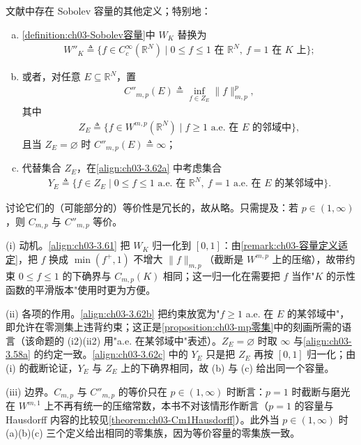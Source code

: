 \documentclass[../../main.tex]{subfiles}%
\begin{document}
\begin{remark}\label{remark:ch03-其他容量定义}
文献中存在 Sobolev 容量的其他定义；特别地：
\begin{enumerate}[(a)]
\item \cref{definition:ch03-Sobolev容量}中 $W_K$ 替换为
\begin{align}
W''_K\triangleq \{f\in C^\infty_c(\mathbb{R}^N)\mid 0\leqslant f\leqslant1\text{ 在 }\mathbb{R}^N,\ f=1\text{ 在 }K\text{ 上}\};\label{align:ch03-3.61}
\end{align}
\item 或者，对任意 $E\subseteq\mathbb{R}^N$，置
\begin{align}
C''_{m,p}(E)\triangleq \inf_{f\in Z_E}\|f\|_{m,p}^p,\label{align:ch03-3.62a}
\end{align}
其中
\begin{align}
Z_E\triangleq \{f\in W^{m,p}(\mathbb{R}^N)\mid f\geqslant1\text{ a.e. 在 }E\text{ 的邻域中}\},\label{align:ch03-3.62b}
\end{align}
且当 $Z_E=\varnothing $ 时 $C''_{m,p}(E)\triangleq \infty$；
\item 代替集合 $Z_E$，在\eqref{align:ch03-3.62a} 中考虑集合
\begin{align}
Y_E\triangleq \{f\in Z_E\mid 0\leqslant f\leqslant1\text{ a.e. 在 }\mathbb{R}^N,\ f=1\text{ a.e. 在 }E\text{ 的某邻域中}\}.\label{align:ch03-3.62c}
\end{align}
\end{enumerate}
讨论它们的（可能部分的）等价性是冗长的，故从略。只需提及：若 $p\in(1,\infty)$，则 $C_{m,p}$ 与 $C''_{m,p}$ 等价。
\end{remark}

\begin{remark}\label{remark:ch03-其他容量定义补充}
(i) 动机。\eqref{align:ch03-3.61} 把 $W_K$ 归一化到 $[0,1]$：由\cref{remark:ch03-容量定义适定}，把 $f$ 换成 $\min(f^+,1)$ 不增大 $\|f\|_{m,p}$（截断是 $W^{m,p}$ 上的压缩），故带约束 $0\leqslant f\leqslant1$ 的下确界与 $C_{m,p}(K)$ 相同；这一归一化在需要把 $f$ 当作"$K$ 的示性函数的平滑版本"使用时更为方便。

(ii) 各项的作用。\eqref{align:ch03-3.62b} 把约束放宽为"$f\geqslant1$ a.e. 在 $E$ 的某邻域中"，即允许在零测集上违背约束；这正是\cref{proposition:ch03-mp零集}中的刻画所需的语言（该命题的 (i2)(ii2) 用"a.e. 在某邻域中"表述）。$Z_E=\varnothing$ 时取 $\infty$ 与\eqref{align:ch03-3.58a} 的约定一致。\eqref{align:ch03-3.62c} 中的 $Y_E$ 只是把 $Z_E$ 再按 $[0,1]$ 归一化；由 (i) 的截断论证，$Y_E$ 与 $Z_E$ 上的下确界相同，故 (b) 与 (c) 给出同一个容量。

(iii) 边界。$C_{m,p}$ 与 $C''_{m,p}$ 的等价只在 $p\in(1,\infty)$ 时断言：$p=1$ 时截断与磨光在 $W^{m,1}$ 上不再有统一的压缩常数，本书不对该情形作断言（$p=1$ 的容量与 Hausdorff 内容的比较见\cref{theorem:ch03-Cm1Hausdorff}）。此外当 $p\in(1,\infty)$ 时 (a)(b)(c) 三个定义给出相同的零集族，因为等价容量的零集族一致。
\end{remark}
\end{document}

